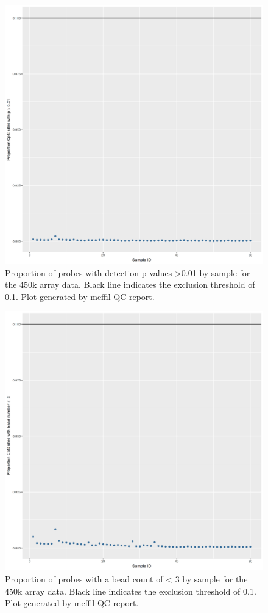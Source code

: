 \documentclass[]{book}
\begin{document}
\begin{figure}

{\centering \includegraphics[width=0.8\linewidth]{figs/MAVIDOSqc450kpropSites} 

}

\caption{Proportion of probes with detection p-values \textgreater0.01 by sample for the 450k array data. Black line indicates the exclusion threshold of 0.1. Plot generated by meffil QC report.}\label{fig:MAVIDOSqc450kpropSites}
\end{figure}



\begin{figure}

{\centering \includegraphics[width=0.8\linewidth]{figs/MAVIDOSqc450kbeadNum} 

}

\caption{Proportion of probes with a bead count of \textless{} 3 by sample for the 450k array data. Black line indicates the exclusion threshold of 0.1. Plot generated by meffil QC report.}\label{fig:MAVIDOSqc450kbeadNum}
\end{figure}
\end{document}

